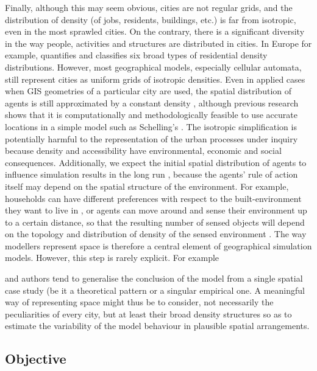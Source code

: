 \documentclass[preprint,5p,times,twocolumn,authoryear]{elsarticle}
\begin{document}
Finally, although this may seem obvious, cities are not regular grids, and the distribution of density (of jobs, residents, buildings, etc.) is far from isotropic, even in the most sprawled cities. On the contrary, there is a significant diversity in the way people, activities and structures are distributed in cities. In Europe for example, \citet{LeNechet2015} quantifies and classifies six broad types of residential density distributions. However, most geographical models, especially cellular automata, still represent cities as uniform grids of isotropic densities. Even in applied cases when GIS geometries of a particular city are used, the spatial distribution of agents is still approximated by a constant density \citep{arribas2014diverse}, although previous research shows that it is computationally and methodologically feasible to use accurate locations in a simple model such as Schelling's \citep{benenson2002entity}. The isotropic simplification is potentially harmful to the representation of the urban processes under inquiry because density and accessibility have environmental, economic and social consequences. Additionally, we expect the initial spatial distribution of agents to influence simulation results in the long run \citep{Castellanoetal2009}, because the agents' rule of action itself may depend on the spatial structure of the environment. For example, households can have different preferences with respect to the built-environment they want to live in \citep{SpielmanHarrison2014}, or agents can move around and sense their environment up to a certain distance, so that the resulting number of sensed objects will depend on the topology \citep{Banos2012} and distribution of density of the sensed environment \citep{LauriJaggi2003, FossettDietrich2009}. The way modellers represent space is therefore a central element of geographical simulation models. However, this step is rarely explicit. For example

and authors tend to generalise the conclusion of the model from a single spatial case study (be it a theoretical pattern or a singular empirical one. A meaningful way of representing space might thus be to consider, not necessarily the peculiarities of every city, but at least their broad density structures so as to estimate the variability of the model behaviour in plausible spatial arrangements.

\subsection{Objective}
\end{document}
